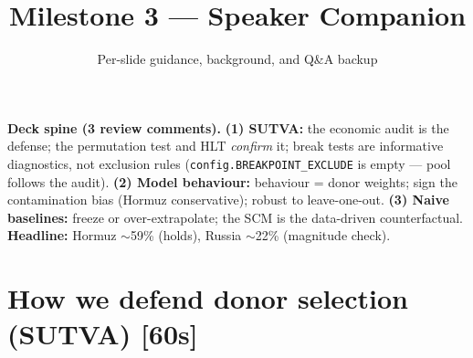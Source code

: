 \documentclass[11pt,a4paper]{article}
\title{\bfseries Milestone 3 --- Speaker Companion}
\author{Per-slide guidance, background, and Q\&A backup}
\date{}
\newcommand{\timetag}[1]{\hfill\textcolor{muted}{\small[#1]}}
\begin{document}
\maketitle
\vspace{-2em}

\begin{tcolorbox}[colback=lightbg,colframe=accent!40,arc=2pt]
\textbf{Deck spine (3 review comments).} \textbf{(1) SUTVA:} the economic audit is the defense; the
permutation test and HLT \emph{confirm} it; break tests are informative diagnostics, not exclusion
rules (\texttt{config.BREAKPOINT\_EXCLUDE} is empty --- pool follows the audit). \textbf{(2) Model
behaviour:} behaviour = donor weights; sign the contamination bias (Hormuz conservative); robust to
leave-one-out. \textbf{(3) Naive baselines:} freeze or over-extrapolate; the SCM is the data-driven
counterfactual. \textbf{Headline:} Hormuz $\sim$59\% (holds), Russia $\sim$22\% (magnitude check).
\end{tcolorbox}

\section{How we defend donor selection (SUTVA) \timetag{60s}}
\end{document}

